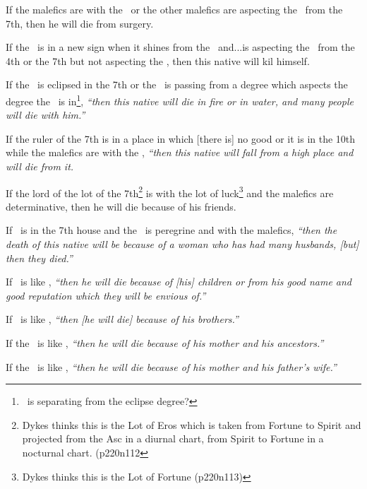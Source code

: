If  the malefics are with the \Moon\, or the other malefics are aspecting the \Moon\, from the 7th, then he will die from surgery.

If  the \Moon\, is in a new sign when it shines from the \Sun\, and...is aspecting the \Sun\, from the 4th or the 7th but not aspecting the \Moon, then this native will kil himself.

If  the \Sun\, is eclipsed in the 7th or the \Moon\, is passing from a degree which aspects the degree the \Sun\, is in\footnote{\Moon\, is separating from the eclipse degree?}, \textsl{``then this native will die in fire or in water, and many people will die with him.''}

If  the ruler of the 7th is in a place in which [there is] no good or it is in the 10th while the malefics are with the \Moon, \textsl{``then this native will fall from a high place and will die from it.}

If  the lord of the lot of the 7th\footnote{Dykes thinks this is the Lot of Eros which is taken from Fortune to Spirit and projected from the Asc in a diurnal chart, from Spirit to Fortune in a nocturnal chart. (p220n112} is with the lot of luck\footnote{Dykes thinks this is the Lot of Fortune (p220n113)} and the malefics are determinative, then he will die because of his friends.

If  \Venus\, is in the 7th house and the \Moon\, is peregrine and with the malefics, \textsl{``then the death of this native will be because of a woman who has had many husbands, [but] then they died.''}

If  \Jupiter\, is like \Venus, \textsl{``then he will die because of [his] children or from his good name and good reputation which they will be envious of.''}

If  \Mars\, is like \Venus, \textsl{``then [he will die] because of his brothers.''}

If  the \Sun\, is like \Venus, \textsl{``then he will die because of his mother and his ancestors.''}

If  the \Moon\, is like \Venus, \textsl{``then he will die because of his mother and his father's wife.''}



